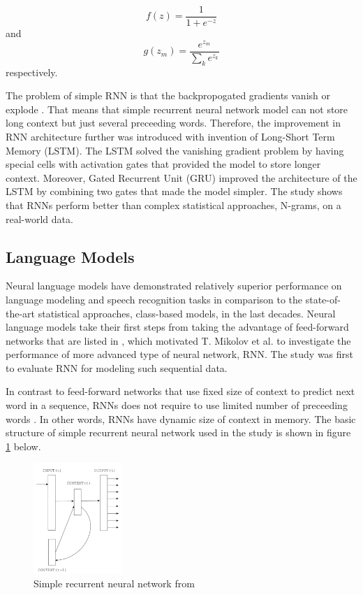 \documentclass{IEEEtran}
\begin{document}
\begin{equation}
	f(z) = \frac{1}{1+e^{-z}}
\end{equation}
and
\begin{equation}
	g(z_m) = \frac{e^{z_m}}{\sum_k{e^{z_k}}}
\end{equation}
respectively.

The problem of simple RNN is that the backpropogated gradients vanish or explode \cite{rnn}. That means that simple recurrent neural network model can not store long context but just several preceeding words. Therefore, the improvement in RNN architecture further was introduced with invention of Long-Short Term Memory (LSTM). The LSTM solved the vanishing gradient problem by having special cells with activation gates that provided the model to store longer context. Moreover, Gated Recurrent Unit (GRU) improved the architecture of the LSTM by combining two gates that made the model simpler. The study \cite{rnn} shows that RNNs perform better than complex statistical approaches, N-grams, on a real-world data.

\subsection{Language Models}

Neural language models have demonstrated relatively superior performance on language modeling and speech recognition tasks in comparison to the state-of-the-art statistical approaches, class-based models, in the last decades. Neural language models take their first steps from taking the advantage of feed-forward networks that are listed in \cite{Mikolov2010NeuralLM}, which motivated T. Mikolov et al. to investigate the performance of more advanced type of neural network, RNN. The study was first to evaluate RNN for modeling such sequential data.

In contrast to feed-forward networks that use fixed size of context to predict next word in a sequence, RNNs does not require to use limited number of preceeding words \cite{Mikolov2010NeuralLM}. In other words, RNNs have dynamic size of context in memory. The basic structure of simple recurrent neural network used in the study is shown in figure \ref{fig:rnn} below.

\begin{figure}[h]
	\centering
	\includegraphics[width=0.3\textwidth]{rnn}
	\caption{Simple recurrent neural network from \cite{Mikolov2010NeuralLM}}
	\label{fig:rnn}
\end{figure}
\end{document}
